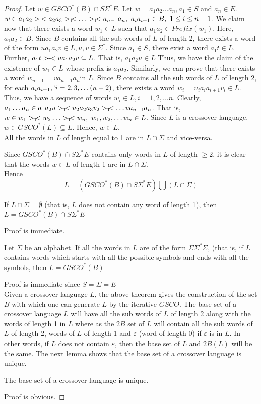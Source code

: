 \documentclass{llncs}
\newcommand{\sg}{\Sigma}
\newcommand{\ve}{\varepsilon}
\newcommand{\rs}{\hspace{-3.5mm}-\hspace{-2mm}<}
\begin{document}
\begin{proof}
 Let $w \in  GSCO^*(B) \cap S \Sigma^* E$.
Let $w = a_1a_2 \ldots a_n, a_1 \in S $ and $a_n \in  E$. $w \in
a_1a_2
>_1\rs a_2a_3 >_1\rs  \ldots >_1\rs a_{n-1}a_n,~  a_ia_{i+1} \in B,~1\leq i\leq n-1$. We
claim now that there exists a word $w_1 \in L$ such that $a_1a_2 \in
Prefix(w_1)$. Here, $a_1a_2 \in B$. Since $B$ contains all the sub
words  of $L$ of length 2, there exists a word of the form $ua_1a_2v
\in L, u,v \in \Sigma^*$.  Since $a_1 \in S $, there exist a word
$a_1t \in L$. Further, $a_1t >_1\rs ua_1a_2v \subseteq L$. That is,
$a_1a_2u \in L$ Thus, we have the claim of the existence of $w_1 \in
L$ whose prefix is $a_1a_2$. Similarly, we can prove that there
exists a word $w_{n-1} =va_{n-1}a_n$in $L$. Since $B$ contains all
the sub words  of $L$ of length 2, for each
$a_ia_{i+1},`i=2,3,\ldots (n-2)$, there exists a word $w_i =
u_ia_ia_{i+1}v_i \in L.$  Thus, we have a sequence of words $w_i \in
L ,  i =1,2,...n$.  Clearly, $a_1 \ldots a_n  \in a_1a_2u >_1\rs
u_2a_2a_3v_2 >_1\rs \ldots va_{n-1}a_n$. That is, $ w \in  w_1
>_1\rs w_2 \ldots >_1\rs w_n ,~ w_1,w_2,\ldots w_n \in L$.  Since
$L$ is a crossover language, $w \in GSCO^*(L) \subseteq L$.  Hence,
$w \in L$.
\\

 All the words in $L$ of length equal to 1
are in $L\cap\sg$ and vice-versa.

  Since $GSCO^*(B) \cap S
\Sigma^* E$ contains only words in $L$ of length $\geq2$, it is
clear that the words  $w\in L$ of length 1 are in $ L \cap
\Sigma$.\\
Hence
\[L = (GSCO^*(B)  \cap S \Sigma^* E)  \bigcup  (L \cap \Sigma) \]

\begin{corollary}
If $L \cap \sg = \emptyset$ (that is, $L$ does not contain any word
of length 1), then $L = GSCO^*(B) \cap S \sg^* E $
\end{corollary}
Proof is immediate.
\begin{corollary} Let $\sg$ be an alphabet.
If all the words in $L$ are  of the form $\sg \sg^* \sg$, (that is,
if $L$ contains words which starts with all the possible symbols and
ends with all the symbols, then $L=GSCO^*(B)$
\end{corollary}
Proof is immediate since $S = \sg = E$ \\
Given a crossover language $L$, the above theorem gives the
construction of the set $B$ with which one can generate $L$ by the
iterative $GSCO$.  The base set of a  crossover language $L$ will
have all the sub words of $L$ of  length 2 along with the words of
length 1 in $L$ where as the $2B$ set of $L$ will contain all the
sub words of $L$ of length 2, words of $L$ of  length 1 and $\ve$
(word of length 0) if $\ve$ is in $L$. In other words, if $L$ does
not contain $\ve$, then the base set of $L$ and $2B(L)$ will be the
same. The next lemma shows that the base set of a crossover language
is unique.
\begin{lemma}
 The base set of a crossover language is unique.
\end{lemma}
Proof is obvious.


\end{proof}
\end{document}
